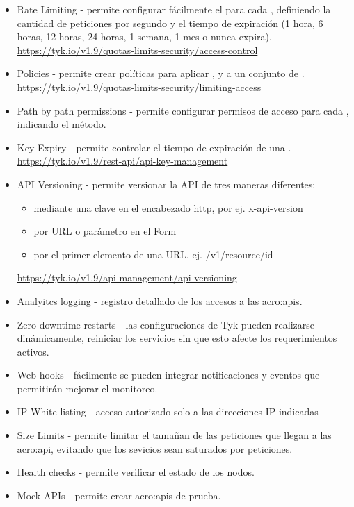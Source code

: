 \begin{itemize}
  \item Rate Limiting - permite configurar fácilmente el  para cada , definiendo la cantidad de peticiones por segundo y el tiempo de expiración (1 hora, 6 horas, 12 horas, 24 horas, 1 semana, 1 mes o nunca expira). \\
  \url{https://tyk.io/v1.9/quotas-limits-security/access-control}
  \item Policies - permite crear políticas para aplicar ,  y  a un conjunto de . \\
  \url{https://tyk.io/v1.9/quotas-limits-security/limiting-access}
  \item Path by path permissions - permite configurar permisos de acceso para cada , indicando el método.
  \item Key Expiry - permite controlar el tiempo de expiración de una . \\
  \url{https://tyk.io/v1.9/rest-api/api-key-management}
  \item API Versioning - permite versionar la API de tres maneras diferentes:
  \begin{itemize}
    \item mediante una clave en el encabezado http, por ej. x-api-version
    \item por URL o parámetro en el Form
    \item por el primer elemento de una URL, ej. /v1/resource/id
  \end{itemize}
  \url{https://tyk.io/v1.9/api-management/api-versioning}
  \item Analyitcs logging - registro detallado de los accesos a las \glspl{acro:api}.
  \item Zero downtime restarts - las configuraciones de Tyk pueden realizarse dinámicamente, reiniciar los servicios sin que esto afecte los requerimientos activos.
  \item Web hooks - fácilmente se pueden integrar notificaciones y eventos que permitirán mejorar el monitoreo.
  \item IP White-listing - acceso autorizado solo a las direcciones IP indicadas
  \item Size Limits - permite limitar el tamañan de las peticiones que llegan a las \gls{acro:api}, evitando que los sevicios sean saturados por peticiones.
  \item Health checks - permite verificar el estado de los nodos.
  \item Mock APIs - permite crear \glspl{acro:api} de prueba.

\end{itemize}
